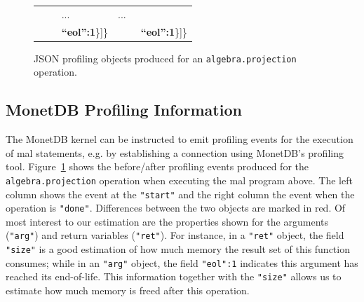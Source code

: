 \documentclass[conference]{IEEEtran}
\begin{document}
\begin{figure}[t]
{\begin{tabular}{|l@{~}l|}
 ~~~~   ...                                               &   ...                                                        \\
 ~~~~   \textbf{``eol'':1}\}]\}                           &   ~~~~    \textbf{``eol'':1}\}]\}                            \\
\hline
\end{tabular}
}
\caption{JSON profiling objects produced for an \texttt{\small algebra.projection} operation.}
\label{fig:json_obj}
\end{figure}

\subsection{MonetDB Profiling Information}

The MonetDB kernel can be instructed to emit profiling events for the execution of {\sc mal} statements, e.g. by establishing a connection using MonetDB’s profiling tool.
Figure~\ref{fig:json_obj} shows the before/after profiling events produced for the \texttt{\small algebra.projection} operation when executing the {\sc mal} program above.
The left column shows the event at the \texttt{\small "start"} and the right column the event when the operation is \texttt{\small "done"}.
Differences between the two objects are marked in red.
Of most interest to our estimation are the properties shown for the arguments (\texttt{\small "arg"}) and return variables (\texttt{\small "ret"}).
For instance, in a \texttt{\small "ret"} object, the field \texttt{\small "size"} is a good estimation of how much memory the result set of this function consumes; while in an \texttt{\small "arg"} object, the field \texttt{\small "eol":1} indicates this argument has reached its end-of-life.
This information together with the \texttt{\small "size"} allows us to estimate how much memory is freed after this operation.
\end{document}

